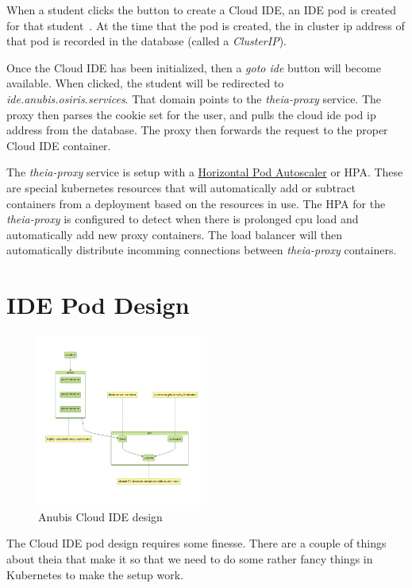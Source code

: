 When a student clicks the button to create a Cloud IDE, 
an IDE pod is created for that student~.
At the time that the pod is created, the in cluster ip address
of that pod is recorded in the database (called a \textit{ClusterIP}).

Once the Cloud IDE has been initialized, then a \textit{goto ide} button
will become available.
When clicked, the student will be redirected to \textit{ide.anubis.osiris.services}.
That domain points to the \textit{theia-proxy} service.
The proxy then parses the cookie set for the user, and pulls the 
cloud ide pod ip address from the database.
The proxy then forwards the request to the proper Cloud IDE container.

The \textit{theia-proxy} service is setup with a 
\href{https://kubernetes.io/docs/tasks/run-application/horizontal-pod-autoscale/}{Horizontal Pod Autoscaler} or HPA.
These are special kubernetes resources that will automatically add or subtract containers
from a deployment based on the resources in use.
The HPA for the \textit{theia-proxy} is configured to detect when 
there is prolonged cpu load and automatically add new proxy containers.
The load balancer will then automatically distribute incomming connections
between \textit{theia-proxy} containers.


\section{IDE Pod Design}

\begin{figure}[ht]
    \centering
    \includegraphics[width=0.5\textwidth]{figures/theia-pod.mmd}
    \caption{Anubis Cloud IDE design\label{fig:anubis-ide}}
\end{figure}

The Cloud IDE pod design requires some finesse. 
There are a couple of things about theia that make it so that
we need to do some rather fancy things in Kubernetes to make 
the setup work.

